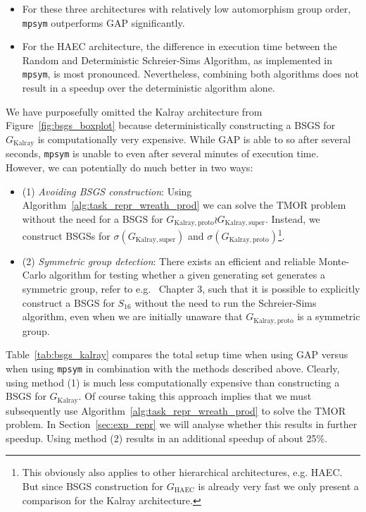 \begin{itemize}
\item For these three architectures with relatively low automorphism group order,
\texttt{mpsym} outperforms GAP significantly.

\item For the HAEC architecture, the difference in execution time between the
Random and Deterministic Schreier-Sims Algorithm, as implemented in
\texttt{mpsym}, is most pronounced.  Nevertheless, combining both algorithms
does not result in a speedup over the deterministic algorithm alone.
\end{itemize}
%
We have purposefully omitted the Kalray architecture from
Figure~\ref{fig:bsgs_boxplot} because deterministically constructing a BSGS for
$G_{\mathrm{Kalray}}$ is computationally very expensive. While GAP is able to
so after several seconds, \texttt{mpsym} is unable to even after several
minutes of execution time. However, we can potentially do much better in two ways:

\begin{itemize}
\item (1) \textit{Avoiding BSGS construction}: Using
Algorithm~\ref{alg:task_repr_wreath_prod} we can solve the TMOR problem without
the need for a BSGS for $G_{\mathrm{Kalray,proto}} \wr
G_{\mathrm{Kalray,super}}$. Instead, we construct BSGSs for
$\sigma(G_{\mathrm{Kalray,super}})$ and
$\sigma(G_{\mathrm{Kalray,proto}})$\footnote{This obviously also applies to
other hierarchical architectures, e.g. HAEC. But since BSGS construction for
$G_{\mathrm{HAEC}}$ is already very fast we only present a comparison for the
Kalray architecture.}.
%
\item (2) \textit{Symmetric group detection}: There exists an efficient and
reliable Monte-Carlo algorithm for testing whether a given generating set
generates a symmetric group, refer to e.g.~\cite{Holt} Chapter 3, such that it
is possible to explicitly construct a BSGS for $S_{16}$ without the need to run
the Schreier-Sims algorithm, even when we are initially unaware that
$G_{\mathrm{Kalray,proto}}$ is a symmetric group.
\end{itemize}

\noindent
Table~\ref{tab:bsgs_kalray} compares the total setup time when using GAP versus
when using \texttt{mpsym} in combination with the methods described above.
Clearly, using method (1) is much less computationally expensive than
constructing a BSGS for $G_{\mathrm{Kalray}}$. Of course taking this approach
implies that we must subsequently use Algorithm~\ref{alg:task_repr_wreath_prod}
to solve the TMOR problem. In Section~\ref{sec:exp_repr} we will analyse
whether this results in further speedup. Using method (2) results in an
additional speedup of about 25\%.

